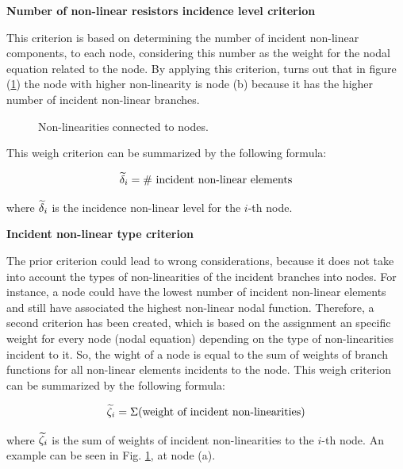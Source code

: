 \documentclass[conference,letterpaper,onecolumn,11pt]{IEEEtran}
\def\boldtild{\mathaccent"0365 }
\newcommand{\puttilde}[1]{\boldtild{\boldmath #1}}
\begin{document}
\begin{description}
\item {\bf Number of non-linear resistors incidence level criterion}\hfill\par

This criterion is based on determining the number of incident non-linear components, to each node, considering this number as the weight for the nodal equation related to the node. By applying this criterion, turns out that in figure (\ref{rams}) the node with higher non-linearity is node ({\sf b}) because it has the higher number of incident non-linear branches.

\begin{figure}[!h]
\centerline{
\epsfxsize=120mm
}
\caption{Non-linearities connected to nodes.}
\label{rams}
\end{figure}

This weigh criterion can be summarized by the following formula:

\begin{equation}
\puttilde{\delta}_i =  \mbox{\# incident non-linear elements}
\end{equation}

where $\puttilde{\delta}_i$ is the incidence non-linear level for the $i$-th node.

\item {\bf Incident non-linear type criterion}\hfill\par

The prior criterion could lead to wrong considerations, because it does not take into account the types of non-linearities of the incident branches into nodes. For instance, a node could have the lowest number of incident non-linear elements and still have associated the highest non-linear nodal function. Therefore, a second criterion has been created, which is based on the assignment an specific weight for every node (nodal equation) depending on the type of non-linearities incident to it. So, the wight of a node is equal to the sum of weights of branch functions for all non-linear elements incidents to the node. This weigh criterion can be summarized by the following formula:

\begin{equation}
\puttilde{\zeta}_i = \Sigma (\mbox{weight of incident non-linearities})
\end{equation}

where $\puttilde{\zeta}_i$ is the sum of weights of incident non-linearities to the $i$-th node. An example can be seen in Fig. \ref{rams}, at node (a).
\end{description}
\end{document}
